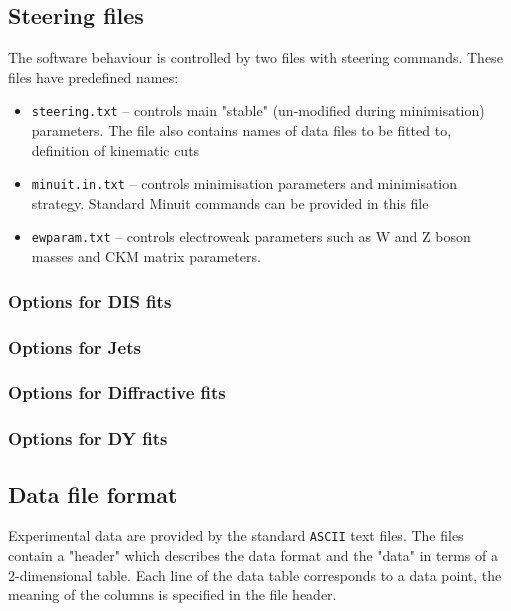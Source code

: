 \label{sec:man}
\subsection{Steering files}
    The software behaviour is controlled by two files with steering commands.
    These files have predefined names:
    \begin{itemize}
      \item {\tt steering.txt}  --   controls main "stable" (un-modified during 
                         minimisation) parameters. The file also contains
                         names of data files to be fitted to, definition 
                         of kinematic cuts                              
      \item {\tt minuit.in.txt}
                   --  controls minimisation parameters and minimisation 
                         strategy. Standard Minuit commands can be provided
                         in this file
      \item {\tt ewparam.txt}    --  controls electroweak parameters such
         as W and Z boson masses and CKM matrix parameters.
    \end{itemize}
\subsubsection{Options for DIS fits}
\subsubsection{Options for Jets}
\subsubsection{Options for Diffractive fits}
\subsubsection{Options for DY fits}
\subsection{Data file format}
\label{sec:dataformat}
   Experimental data are provided by the standard {\tt ASCII} text files. The files
   contain a "header" which describes the data format and the "data" in terms
   of a 2-dimensional table. Each line of the data table corresponds to a
   data point, the meaning of the columns is specified in the file header.

